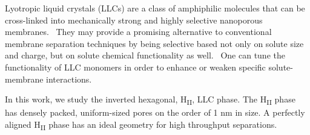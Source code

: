 \documentclass[journal=ancac3,manuscript=article,layout=twocolumn]{achemso}
\begin{document}

  Lyotropic liquid crystals (LLCs) are a class of amphiphilic molecules that
  can be cross-linked into mechanically strong and highly selective nanoporous
  membranes.~\cite{gin_polymerized_2008} They may provide a promising
  alternative to conventional membrane separation techniques by being selective
  based not only on solute size and charge, but on solute chemical
  functionality as well.~\cite{dischinger_application_2017} One can tune the
  functionality of LLC monomers in order to enhance or weaken specific
  solute-membrane interactions.~\cite{dischinger_effect_2017} 

  In this work, we study the inverted hexagonal, H\textsubscript{II}, LLC phase. 
  The H\textsubscript{II} phase has densely packed, uniform-sized pores on the 
  order of 1 nm in size. A perfectly aligned H\textsubscript{II} phase has 
  an ideal geometry for high throughput separations.~\cite{feng_scalable_2014,feng_thin_2016}
\end{document}
